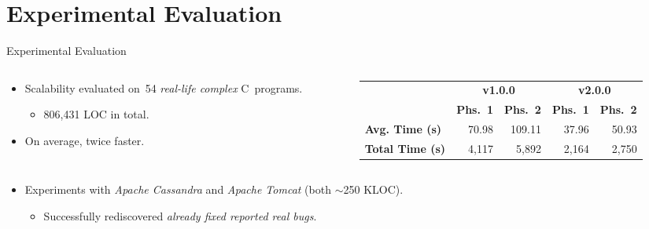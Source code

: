 \documentclass[10pt, xcolor=pdflatex, hyperref={unicode}, aspectratio=169]{beamer}
\begin{document}
\section{Experimental Evaluation}
\begin{frame}{Experimental Evaluation}
    \begin{columns}
        \begin{column}{.45 \linewidth}
            \begin{itemize}\setlength\itemsep{1em}
                \item \alert{Scalability} evaluated on~54 \emph{real-life complex} C~programs.
                    \medskip
                    \begin{itemize}
                        \item 806,431 LOC in total.
                    \end{itemize}

                \item On average, \alert{twice faster}.
            \end{itemize}
        \end{column}

        \begin{column}{.55 \linewidth}
            \centering
            \begin{tabular}{|l|r|r|r|r|}
                \hline

                \multirow{2}{*}{} & \multicolumn{2}{c|}{\textbf{v1.0.0}} & \multicolumn{2}{c|}{\textbf{v2.0.0}} \\ \cline{2-5}

                & \textbf{Phs.~1} & \textbf{Phs.~2} & \textbf{Phs.~1} & \textbf{Phs.~2} \\ \hline \hline

                \textbf{Avg. Time (s)} & 70.98 & 109.11 & 37.96 & 50.93 \\ \hline

                \textbf{Total Time (s)} & 4,117 & 5,892 & 2,164 & 2,750 \\ \hline
            \end{tabular}
        \end{column}

        \hfill
    \end{columns}

    \vfill

    \begin{columns}
        \begin{column}{1.07 \linewidth}
            \begin{itemize}
                \item Experiments with \emph{Apache Cassandra} and \emph{Apache Tomcat} (both $ \sim $250 KLOC).
                    \bigskip
                    \begin{itemize}\setlength\itemsep{1.5em}
                        \item Successfully \alert{rediscovered} \emph{already fixed reported real bugs}.


\end{itemize}
\end{itemize}
\end{column}
\end{columns}
\end{frame}
\end{document}
